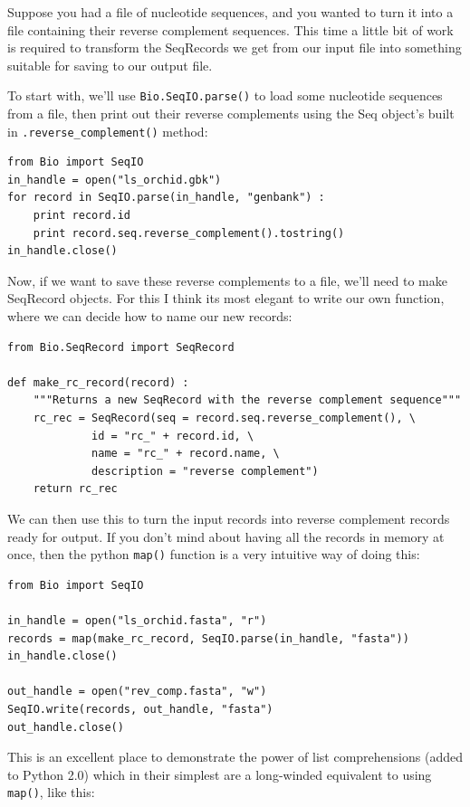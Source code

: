 \documentclass{report}
\begin{document}
Suppose you had a file of nucleotide sequences, and you wanted to turn it into a file containing their reverse complement sequences.  This time a little bit of work is required to transform the SeqRecords we get from our input file into something suitable for saving to our output file.

To start with, we'll use \verb|Bio.SeqIO.parse()| to load some nucleotide
sequences from a file, then print out their reverse complements using
the Seq object's built in \verb|.reverse_complement()| method:

\begin{verbatim}
from Bio import SeqIO
in_handle = open("ls_orchid.gbk")
for record in SeqIO.parse(in_handle, "genbank") :
    print record.id
    print record.seq.reverse_complement().tostring()
in_handle.close()
\end{verbatim}

Now, if we want to save these reverse complements to a file, we'll need to make SeqRecord objects.
For this I think its most elegant to write our own function, where we can decide how to name our
new records:

\begin{verbatim}
from Bio.SeqRecord import SeqRecord

def make_rc_record(record) :
    """Returns a new SeqRecord with the reverse complement sequence"""
    rc_rec = SeqRecord(seq = record.seq.reverse_complement(), \
             id = "rc_" + record.id, \
             name = "rc_" + record.name, \
             description = "reverse complement")
    return rc_rec
\end{verbatim}

We can then use this to turn the input records into reverse complement records ready for output.  If you don't mind about having all the records in memory at once, then the python \verb|map()| function is a very intuitive way of doing this:

\begin{verbatim}
from Bio import SeqIO

in_handle = open("ls_orchid.fasta", "r")
records = map(make_rc_record, SeqIO.parse(in_handle, "fasta"))
in_handle.close()

out_handle = open("rev_comp.fasta", "w")
SeqIO.write(records, out_handle, "fasta")
out_handle.close()
\end{verbatim}

This is an excellent place to demonstrate the power of list comprehensions (added to Python 2.0) which in their simplest are a long-winded equivalent to using \verb|map()|, like this:
\end{document}
